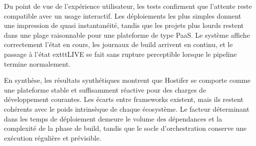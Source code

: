 Du point de vue de l'expérience utilisateur, les tests confirment que l'attente reste compatible avec un usage interactif. Les déploiements les plus simples donnent une impression de quasi instantanéité, tandis que les projets plus lourds restent dans une plage raisonnable pour une plateforme de type PaaS. Le système affiche correctement l'état en cours, les journaux de build arrivent en continu, et le passage à l'état 	exttt{LIVE} se fait sans rupture perceptible lorsque le pipeline termine normalement.

En synthèse, les résultats synthétiques montrent que Hostifer se comporte comme une plateforme stable et suffisamment réactive pour des charges de développement courantes. Les écarts entre frameworks existent, mais ils restent cohérents avec le poids intrinsèque de chaque écosystème. Le facteur déterminant dans les temps de déploiement demeure le volume des dépendances et la complexité de la phase de build, tandis que le socle d'orchestration conserve une exécution régulière et prévisible.

